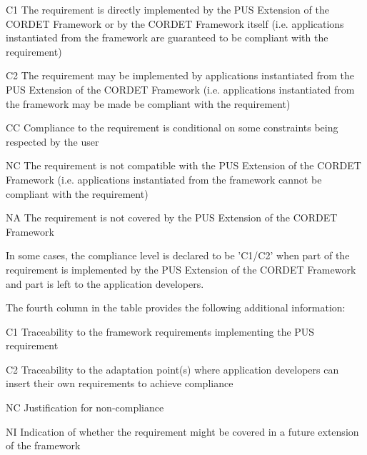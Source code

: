 \documentclass[a4paper,10pt]{article}
\newenvironment{fw_itemize}						%
{\begin{itemize}
  \setlength{\itemsep}{1mm}
  \setlength{\parskip}{0pt}
  \setlength{\parsep}{0pt}}
{\end{itemize}}
\begin{document}
\begin{fw_itemize}
\item [C1] The requirement is directly implemented by the PUS Extension of the CORDET Framework or by the CORDET Framework itself (i.e. applications instantiated from the framework are guaranteed to be compliant with the requirement)
\item [C2] The requirement may be implemented by applications instantiated from the PUS Extension of the CORDET Framework (i.e. applications instantiated from the framework may be made be compliant with the requirement)
\item [CC] Compliance to the requirement is conditional on some constraints being respected by the user
\item [NC] The requirement is not compatible with the PUS Extension of the CORDET Framework (i.e. applications instantiated from the framework cannot be compliant with the requirement)
\item [NA] The requirement is not covered by the PUS Extension of the CORDET Framework
\end{fw_itemize}

In some cases, the compliance level is declared to be 'C1/C2' when part of the requirement is implemented by the PUS Extension of the CORDET Framework and part is left to the application developers.

The fourth column in the table provides the following additional information:

\begin{fw_itemize}
\item [C1] Traceability to the framework requirements implementing the PUS requirement 
\item [C2] Traceability to the adaptation point(s) where application developers can insert their own requirements to achieve compliance
\item [NC] Justification for non-compliance
\item [NI] Indication of whether the requirement might be covered in a future extension of the framework
\end{fw_itemize}
\end{document}
